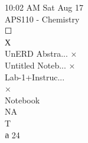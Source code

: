 10:02 AM Sat Aug 17 \\ APS110 - Chemistry \\ ☐ \\ Х \\ UnERD Abstra... × \\ Untitled Noteb... × \\ Lab-1+Instruc... \\ × \\ Notebook \\ NA \\ T \\ ล 24%